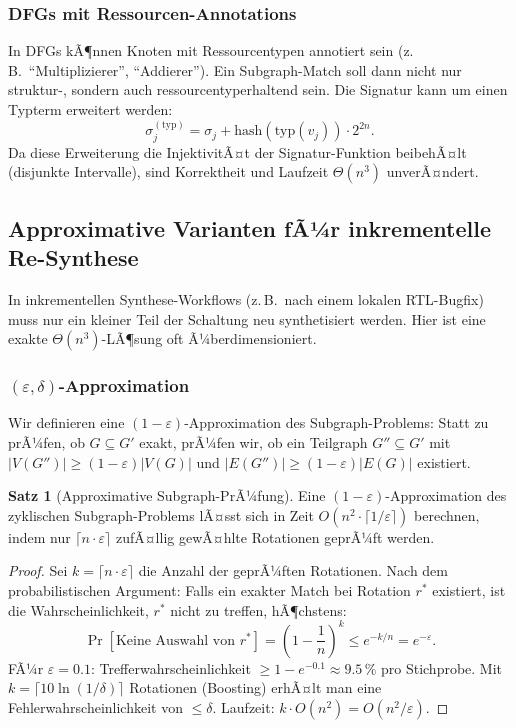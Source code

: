 ﻿\documentclass[a4paper,12pt]{article}
\theoremstyle{definition}
\newtheorem{satz}{Satz}
\begin{document}
\subsubsection{DFGs mit Ressourcen-Annotations}

In DFGs kÃ¶nnen Knoten mit Ressourcentypen annotiert sein (z.\,B.\ ``Multiplizierer'',
``Addierer''). Ein Subgraph-Match soll dann nicht nur struktur-, sondern auch
ressourcentyperhaltend sein. Die Signatur kann um einen Typterm erweitert werden:
\[
  \sigma_j^{(\text{typ})} = \sigma_j + \text{hash}(\text{typ}(v_j)) \cdot 2^{2n}.
\]
Da diese Erweiterung die InjektivitÃ¤t der Signatur-Funktion beibehÃ¤lt (disjunkte
Intervalle), sind Korrektheit und Laufzeit $\Theta(n^3)$ unverÃ¤ndert.

\subsection{Approximative Varianten fÃ¼r inkrementelle Re-Synthese}

In inkrementellen Synthese-Workflows (z.\,B.\ nach einem lokalen RTL-Bugfix) muss
nur ein kleiner Teil der Schaltung neu synthetisiert werden. Hier ist eine exakte
$\Theta(n^3)$-LÃ¶sung oft Ã¼berdimensioniert.

\subsubsection{$(\varepsilon, \delta)$-Approximation}

Wir definieren eine $(1-\varepsilon)$-Approximation des Subgraph-Problems: Statt zu prÃ¼fen,
ob $G \subseteq G'$ exakt, prÃ¼fen wir, ob ein Teilgraph $G'' \subseteq G'$ mit
$|V(G'')| \geq (1-\varepsilon)|V(G)|$ und $|E(G'')| \geq (1-\varepsilon)|E(G)|$ existiert.

\begin{satz}[Approximative Subgraph-PrÃ¼fung]\label{satz:approx}
  Eine $(1-\varepsilon)$-Approximation des zyklischen Subgraph-Problems lÃ¤sst sich in
  Zeit $O\!\left(n^2 \cdot \lceil 1/\varepsilon \rceil\right)$ berechnen, indem nur
  $\lceil n \cdot \varepsilon \rceil$ zufÃ¤llig gewÃ¤hlte Rotationen geprÃ¼ft werden.
\end{satz}

\begin{proof}
  Sei $k = \lceil n \cdot \varepsilon \rceil$ die Anzahl der geprÃ¼ften Rotationen.
  Nach dem probabilistischen Argument: Falls ein exakter Match bei Rotation $r^*$ existiert,
  ist die Wahrscheinlichkeit, $r^*$ nicht zu treffen, hÃ¶chstens:
  \[
    \Pr[\text{Keine Auswahl von } r^*] = \left(1 - \frac{1}{n}\right)^k
    \leq e^{-k/n} = e^{-\varepsilon}.
  \]
  FÃ¼r $\varepsilon = 0.1$: Trefferwahrscheinlichkeit $\geq 1 - e^{-0.1} \approx 9.5\,\%$
  pro Stichprobe. Mit $k = \lceil 10\ln(1/\delta)\rceil$ Rotationen (Boosting) erhÃ¤lt
  man eine Fehlerwahrscheinlichkeit von $\leq \delta$.
  Laufzeit: $k \cdot O(n^2) = O(n^2 / \varepsilon)$.
\end{proof}
\end{document}
